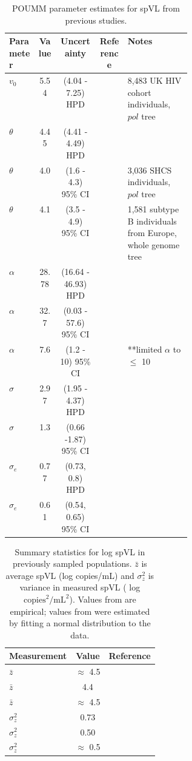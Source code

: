 \documentclass[]{article}
\begin{document}
\begin{table}[H]
\caption{POUMM parameter estimates for spVL from previous studies.}
	\begin{tabular}{lcccp{0.35\linewidth}}
	\hline 
	Parameter & Value & Uncertainty & Reference & Notes \\
	\hline 
	$v_0$ & 5.54 & (4.04 - 7.25) HPD & \citealt{Mitov2018} & 8,483 UK HIV cohort individuals, $pol$ tree \\
	$\theta$ & 4.45 & (4.41 - 4.49) HPD & \citealt{Mitov2018} & \\
	$\theta$ &  4.0 & (1.6 - 4.3) 95\% CI & \citealt{Bertels2018} & 3,036 SHCS individuals, $pol$ tree \\
	$\theta$ & 4.1 & (3.5 - 4.9) 95\% CI & \citealt{Blanquart2017} & 1,581 subtype B individuals from Europe, whole genome tree \\
	$\alpha$ & 28.78 & (16.64 - 46.93) HPD & \citealt{Mitov2018} & \\
	$\alpha$ & 32.7 & (0.03 - 57.6) 95\% CI & \citealt{Bertels2018} & \\
	$\alpha$ & 7.6 & (1.2 - 10) 95\% CI & \citealt{Blanquart2017} & **limited $\alpha$ to $\le$ 10 \\
	$\sigma$ & 2.97 & (1.95 - 4.37) HPD & \citealt{Mitov2018} & \\
	$\sigma$ & 1.3 & (0.66 -1.87) 95\% CI &  \citealt{Blanquart2017} & \\
	$\sigma_e$ & 0.77 & (0.73, 0.8) HPD & \citealt{Mitov2018} & \\
	$\sigma_e$ & 0.61 & (0.54, 0.65) 95\% CI &  \citealt{Blanquart2017} & \\
	\hline 
	\end{tabular}
	\label{tab:POUMMparams}
\end{table}

\begin{table}[H]
\caption{Summary statistics for log spVL in previously sampled populations. $\bar{z}$ is average spVL (log copies/mL) and $\sigma^2_z$ is variance in measured spVL ( log $\textrm{copies}^2/\textrm{mL}^2$). Values from \protect\citet{Blanquart2017, Mitov2018} are empirical; values from \protect\cite{Bonhoeffer2015} were estimated by fitting a normal distribution to the data.}
	\begin{tabular}{lcc} \hline 
	Measurement & Value & Reference \\ \hline 
	$\bar{z}$ & $\approx$ 4.5 & \citealt{Mitov2018} \\
	$\bar{z}$ &  4.4 & \citealt{Blanquart2017} \\
	$\bar{z}$ & $\approx$ 4.5 & \citealt{Bonhoeffer2015} \\
	$\sigma^2_z$ &  0.73 &  \citealt{Mitov2018} \\
	$\sigma^2_z$ &  0.50 & \citealt{Blanquart2017} \\
	$\sigma^2_z$ & $\approx$ 0.5 & \citealt{Bonhoeffer2015} \\ \hline 
	\end{tabular}
	\label{tab:spVLmeasurements}
\end{table}
\end{document}
